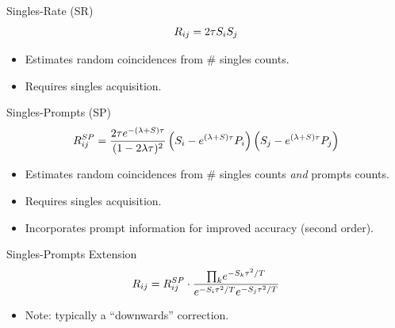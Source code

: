 \documentclass[pdf]{beamer}
\begin{document}
\begin{frame}{Singles-Rate (SR)}
    $$R_{ij} = 2 \rn{tau}{\tau} \rn{si}{S_i} \rn{sj}{S_j}$$

    \vspace{2em}

    \begin{itemize}
        \item Estimates random coincidences from \# singles counts. 
        \item Requires singles acquisition.
    \end{itemize}
\end{frame}

\begin{frame}{Singles-Prompts (SP)}
    $$R_{ij}^{SP} = \frac{2 \tau e^{-(\lambda + S) \tau}}{(1 - 2 \rn{lam}{\lambda} \tau)^2 } \left(S_i - e^{(\lambda + S) \tau} \rn{prompti}{P_i}\right) \left(S_j - e^{(\lambda + S) \tau} P_j\right)$$

    \vspace{3em}

    \begin{itemize}
        \item Estimates random coincidences from \# singles counts \textit{and} prompts counts.
        \item Requires singles acquisition.
        \item Incorporates prompt information for improved accuracy (second order).
    \end{itemize}

\end{frame}

\begin{frame}{Singles-Prompts Extension}
    $$R_{ij} = R_{ij}^{SP} \cdot \frac{\rn{prodk}{\prod_k} e^{-S_k \tau^2 / T}}{e^{-S_i \tau^2 / T} e^{- S_j \tau^2 / T}}$$

    \vspace{2em}

    \begin{itemize}
        \item Note: typically a ``downwards'' correction.
    \end{itemize}
\end{frame}
\end{document}
